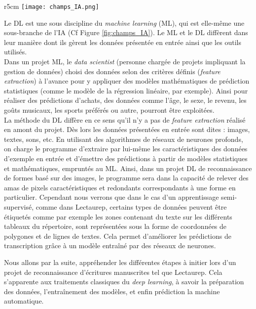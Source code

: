 \begin{wrapfigure}[13]{r}{5cm}
    \centering
    \texttt{[image: champs\_IA.png]}
    \caption{Les différentes disciplines de l'IA \textcopyright L. Terriel, 2020, Diagrams.net}
    \label{fig:champs_IA}
\end{wrapfigure}
Le DL est une sous discipline du \textit{machine learning} (ML), qui est elle-même une sous-branche de l'IA (Cf Figure \ref{fig:champs_IA}). Le ML et le DL diffèrent dans leur manière dont ils gèrent les données présentée en entrée ainsi que les outils utilisés.\\

Dans un projet ML, le \textit{data scientist} (personne chargée de projets impliquant la gestion de données) choisi des données selon des critères définis (\textit{feature extraction}) à l'avance pour y appliquer des modèles mathématiques de prédiction statistiques (comme le modèle de la régression linéaire, par exemple). Ainsi pour réaliser des prédictions d'achats, des données comme l'âge, le sexe, le revenu, les goûts musicaux, les sports préférés ou autre, pourront être exploitées.\\

La méthode du DL diffère en ce sens qu'il n'y a pas de \textit{feature extraction} réalisé en amont du projet. Dès lors les données présentées en entrée sont dites  : images, textes, sons, etc. En utilisant des algorithmes de réseaux de neurones profonds, on charge le programme d'extraire par lui-même les caractéristiques des données d'exemple en entrée et d'émettre des prédictions à partir de modèles statistiques et mathématiques, empruntés au ML. Ainsi, dans un projet DL de reconnaissance de formes basé sur des images, le programme sera dans la capacité de relever des amas de pixels caractéristiques et redondants correspondants à une forme en particulier. Cependant nous verrons que dans le cas d'un apprentissage semi-supervisé, comme dans Lectaurep, certains types de données peuvent être étiquetés comme par exemple les zones contenant du texte sur les différents tableaux du répertoire, sont représentées sous la forme de coordonnées de polygones et de lignes de textes. Cela permet d'améliorer les prédictions de transcription grâce à un modèle entraîné par des réseaux de neurones. 

Nous allons par la suite, appréhender les différentes étapes à initier lors d'un projet de reconnaissance d'écritures manuscrites tel que Lectaurep. Cela s'apparente aux traitements classiques du \textit{deep learning}, à savoir la préparation des données, l'entraînement des modèles, et enfin prédiction la machine automatique.

